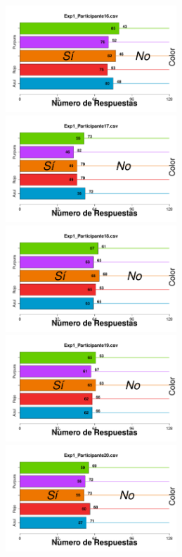 \documentclass[a4paper ]{article}
\begin{document}
\begin{figure}[th]
\begin{center}
\includegraphics[width=8cm, height=4cm]{Figures/BiasColor_Exp1_P16} \includegraphics[width=8cm, height=4cm]{Figures/BiasColor_Exp1_P17} \includegraphics[width=8cm, height=4cm]{Figures/BiasColor_Exp1_P18}
\includegraphics[width=8cm, height=4cm]{Figures/BiasColor_Exp1_P19} \includegraphics[width=8cm, height=4cm]{Figures/BiasColor_Exp1_P20} 
\end{center}
\end{figure}
\clearpage
\end{document}
